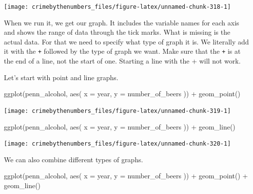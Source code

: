 \documentclass[
  a4paper,
]{krantz}
\makeatletter
\newenvironment{Shaded}{\begin{snugshade}}{\end{snugshade}}
\newcommand{\AttributeTok}[1]{\textcolor[rgb]{0.77,0.63,0.00}{#1}}
\newcommand{\FunctionTok}[1]{\textcolor[rgb]{0.00,0.00,0.00}{#1}}
\newcommand{\NormalTok}[1]{#1}
\newcommand{\SpecialCharTok}[1]{\textcolor[rgb]{0.00,0.00,0.00}{#1}}
\newenvironment{kframe}{%
\medskip{}
\setlength{\fboxsep}{.8em}
 \def\at@end@of@kframe{}%
 \ifinner\ifhmode%
  \def\at@end@of@kframe{\end{minipage}}%
  \begin{minipage}{\columnwidth}%
 \fi\fi%
 \def\FrameCommand##1{\hskip\@totalleftmargin \hskip-\fboxsep
 \colorbox{shadecolor}{##1}\hskip-\fboxsep
     \hskip-\linewidth \hskip-\@totalleftmargin \hskip\columnwidth}%
 \MakeFramed {\advance\hsize-\width
   \@totalleftmargin\z@ \linewidth\hsize
   \@setminipage}}%
 {\par\unskip\endMakeFramed%
 \at@end@of@kframe}
\renewenvironment{Shaded}{\begin{kframe}}{\end{kframe}}
\makeatother
\begin{document}
\begin{center}\texttt{[image: crimebythenumbers\_files/figure-latex/unnamed-chunk-318-1]} \end{center}

When we run it, we get our graph. It includes the variable
names for each axis and shows the range of data through the
tick marks. What is missing is the actual data. For that we
need to specify what type of graph it is. We literally add
it with the \texttt{+} followed by the type of graph we
want. Make sure that the \texttt{+} is at the end of a line,
not the start of one. Starting a line with the + will not
work.

Let's start with point and line graphs.

\begin{Shaded}
\begin{Highlighting}[]
\FunctionTok{ggplot}\NormalTok{(penn\_alcohol, }\FunctionTok{aes}\NormalTok{(}
  \AttributeTok{x =}\NormalTok{ year,}
  \AttributeTok{y =}\NormalTok{ number\_of\_beers}
\NormalTok{)) }\SpecialCharTok{+}
  \FunctionTok{geom\_point}\NormalTok{()}
\end{Highlighting}
\end{Shaded}

\begin{center}\texttt{[image: crimebythenumbers\_files/figure-latex/unnamed-chunk-319-1]} \end{center}

\begin{Shaded}
\begin{Highlighting}[]
\FunctionTok{ggplot}\NormalTok{(penn\_alcohol, }\FunctionTok{aes}\NormalTok{(}
  \AttributeTok{x =}\NormalTok{ year,}
  \AttributeTok{y =}\NormalTok{ number\_of\_beers}
\NormalTok{)) }\SpecialCharTok{+}
  \FunctionTok{geom\_line}\NormalTok{()}
\end{Highlighting}
\end{Shaded}

\begin{center}\texttt{[image: crimebythenumbers\_files/figure-latex/unnamed-chunk-320-1]} \end{center}

We can also combine different types of graphs.

\begin{Shaded}
\begin{Highlighting}[]
\FunctionTok{ggplot}\NormalTok{(penn\_alcohol, }\FunctionTok{aes}\NormalTok{(}
  \AttributeTok{x =}\NormalTok{ year,}
  \AttributeTok{y =}\NormalTok{ number\_of\_beers}
\NormalTok{)) }\SpecialCharTok{+}
  \FunctionTok{geom\_point}\NormalTok{() }\SpecialCharTok{+}
  \FunctionTok{geom\_line}\NormalTok{()}
\end{Highlighting}
\end{Shaded}
\end{document}
